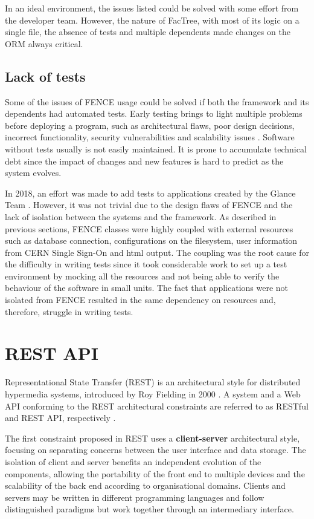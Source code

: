 In an ideal environment, the issues listed could be solved with some effort from the developer team. However, the nature of FacTree, with most of its logic on a single file, the absence of tests and multiple dependents made changes on the ORM always critical.

\subsection{Lack of tests}

Some of the issues of FENCE usage could be solved if both the framework and its dependents had automated tests. Early testing brings to light multiple problems before deploying a program, such as architectural flaws, poor design decisions, incorrect functionality, security vulnerabilities and scalability issues \cite{ibm-software-testing}. Software without tests usually is not easily maintained. It is prone to accumulate technical debt since the impact of changes and new features is hard to predict as the system evolves.

In 2018, an effort was made to add tests to applications created by the Glance Team \cite{alves-tcc}. However, it was not trivial due to the design flaws of FENCE and the lack of isolation between the systems and the framework. As described in previous sections, FENCE classes were highly coupled with external resources such as database connection, configurations on the filesystem, user information from CERN Single Sign-On and \acrshort{html} output. The coupling was the root cause for the difficulty in writing tests since it took considerable work to set up a test environment by mocking all the resources and not being able to verify the behaviour of the software in small units. The fact that applications were not isolated from FENCE resulted in the same dependency on resources and, therefore, struggle in writing tests.

\section{REST API}

Representational State Transfer (REST) is an architectural style for distributed hypermedia systems, introduced by Roy Fielding in 2000 \cite{fielding-rest}. A system and a Web API  conforming to the  REST architectural constraints are referred to as RESTful and REST API, respectively \cite{restfulapi-site}.

The first constraint proposed in REST uses a \textbf{client-server} architectural style, focusing on separating concerns between the user interface and data storage. The isolation of client and server benefits an independent evolution of the components, allowing the portability of the front end to multiple devices and the scalability of the back end according to organisational domains. Clients and servers may be written in different programming languages and follow distinguished paradigms but work together through an intermediary interface.

